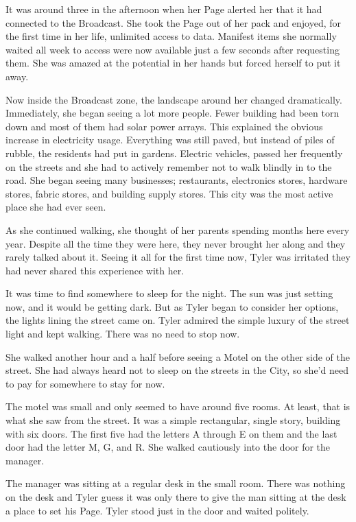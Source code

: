 \documentclass[courier]{sffms}
\begin{document}
It was around three in the afternoon when her Page
alerted her that it had connected to the Broadcast.
She took the Page out of her pack and enjoyed, for the
first time in her life, unlimited access to data. Manifest
items she normally waited all week to access were now
available just a few seconds after requesting them.
She was amazed at the potential in her hands but
forced herself to put it away.

Now inside the Broadcast zone, the landscape around
her changed dramatically. Immediately, she began seeing
a lot more people. Fewer building had been torn down
and most of them had solar power arrays. This explained
the obvious increase in electricity usage.
Everything was still paved, but instead of piles of
rubble, the residents had put in gardens. Electric vehicles,
passed her frequently on the streets and she had to 
actively remember not to walk blindly in to the road.
She began seeing many businesses; restaurants, electronics
stores, hardware stores, fabric stores, and building supply stores.
This city was the most active place she had ever seen.

As she continued walking, she thought of her parents
spending months here every year. Despite all the time
they were here, they never brought her along and they
rarely talked about it. Seeing it all for the first time now,
Tyler was irritated they had never shared this experience
with her.

It was time to find somewhere to sleep for the night. The
sun was just setting now, and it would be getting dark.
But as Tyler began to consider her options, the lights
lining the street came on. Tyler admired the simple
luxury of the street light and kept walking. There was no
need to stop now.

She walked another hour and a half before seeing a Motel
on the other side of the street. She had always heard not
to sleep on the streets in the City, so she'd need to pay
for somewhere to stay for now.

The motel was small and only seemed to have around
five rooms. At least, that is what she saw from the street.
It was a simple rectangular, single story, building with six doors. The
first five had the letters A through E on them and the 
last door had the letter M, G, and R. She walked
cautiously into the door for the manager.

The manager was sitting at a regular desk in the small
room. There was nothing on the desk and Tyler guess 
it was only there to give the man sitting at the desk a 
place to set his Page. Tyler stood just in the door and
waited politely.
\end{document}
